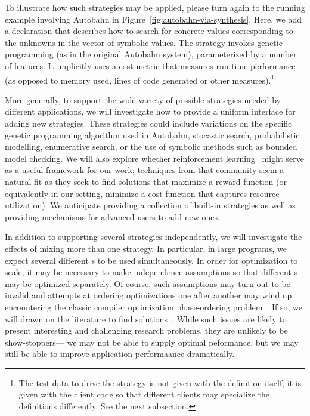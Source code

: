 To illustrate how such strategies may be applied, please turn again to
the running example \rasp involving Autobahn in
Figure~\ref{fig:autobahn-via-synthesis}.  Here, we add a declaration
that describes how to search for concrete values corresponding to the
unknowns in the  vector of symbolic values.  The strategy
invokes genetic programming (as in the original Autobahn system),
parameterized by a number of features.  It implicitly uses a
cost metric that measures run-time performance (as opposed to memory used,
lines of code generated or other measures).\footnote{The test data to drive 
the strategy is not given with the \rasp definition itself, it is given
with the client code so that different clients may specialize the \rasp
definitions differently. See the next subsection.}

More generally, to support the wide variety of possible strategies
needed by different applications, we will investigate how to
provide a uniform interface for adding new strategies.
These strategies could include
variations on the specific genetic programming algorithm used in
Autobahn, stocastic search, probabilistic modelling, enumerative
search, or the use of symbolic methods such as bounded model checking.  We
will also explore whether reinforcement learning~\cite{reinforcement} might
serve as a useful framework for our work; techniques from that
community seem a natural fit as they seek to find solutions that
maximize a reward function (or equivalently in our setting, minimize a
cost function that captures resource utilization).
We anticipate providing a collection of built-in strategies as well as
providing mechanisms for advanced users to add new ones.

In addition to supporting several strategies independently, we will
investigate the effects of mixing more than one strategy.  In
particular, in large programs, we expect several different \rasp{}s to
be used simultaneously.  In order for optimization to scale, it may be
necessary to make independence assumptions so that different \rasp{}s
may be optimized separately.  Of course, such assumptions may turn out
to be invalid and attempts at ordering optimizations one after another
may wind up encountering the classic compiler optimization
phase-ordering
problem~\cite{Click:combining-optimizations,Vegdahl:phase-coupling}.
If so, we will drawn on the literature to find
solutions~\cite{Kulkarni:phase-ordering-search,Kulkarni:phase-ordering}.
While such issues are likely to present interesting and challenging
research problems, they are unlikely to be show-stoppers--- we
may not be able to supply optimal peformance, but we may still be able to
improve application performaance dramatically.

